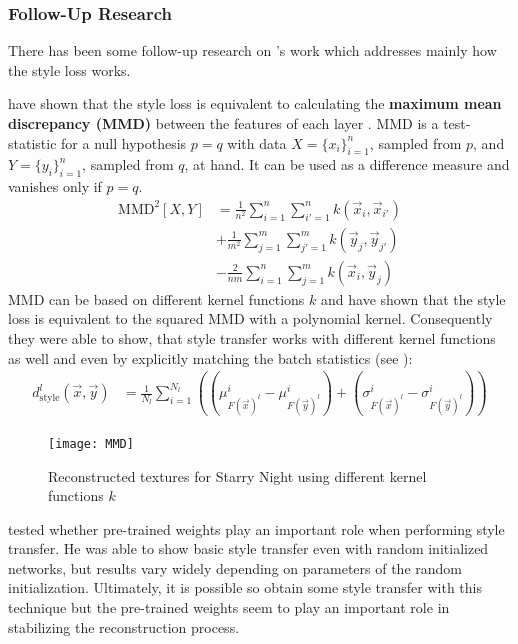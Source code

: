 \subsubsection{Follow-Up Research}
There has been some follow-up research on \citeauthor*{gatys}'s work which addresses mainly how the style loss works.

\citeauthor*{MMD} have shown that the style loss is equivalent to calculating the \textbf{maximum mean discrepancy (MMD)} between the features of each layer \cite{MMD}.
MMD is a test-statistic for a null hypothesis $p=q$ with data $X = \{x_i\}^n_{i=1}$, sampled from $p$, and $Y = \{y_i\}^n_{i=1}$, sampled from $q$, at hand.
It can be used as a difference measure and vanishes only if $p=q$.
\begin{align}
    \text{MMD}^2[X, Y] & = \frac{1}{n^2} \sum^n_{i=1} \sum^n_{i'=1} k(\vec{x}_i, \vec{x}_{i'}) \\
    & + \frac{1}{m^2} \sum^m_{j=1} \sum^m_{j'=1} k(\vec{y}_j, \vec{y}_{j'}) \\
    & - \frac{2}{nm} \sum^n_{i=1} \sum^m_{j=1} k(\vec{x}_i, \vec{y}_{j})
\end{align}
MMD can be based on different kernel functions $k$ and \citeauthor*{MMD} have shown that the style loss is equivalent to the squared MMD with a polynomial kernel.
Consequently they were able to show, that style transfer works with different kernel functions as well and even by explicitly matching the batch statistics (see ):
\begin{align}
    d_{\text{style}}^l(\vec{x}, \vec{y}) & = \frac{1}{N_l} \sum_{i = 1}^{N_l} \left( (\mu^i_{F(\vec{x})^l} - \mu^i_{F(\vec{y})^l}) + (\sigma^i_{F(\vec{x})^l} - \sigma^i_{F(\vec{y})^l}) \right)
\end{align}
\begin{figure}
    \texttt{[image: MMD]}
    \caption[]{Reconstructed textures for Starry Night using different kernel functions $k$ \cite{MMD}}
\end{figure}

\citeauthor*{LenDu} tested whether pre-trained weights play an important role when performing style transfer.
He was able to show basic style transfer even with random initialized networks, but results vary widely depending on parameters of the random initialization.
Ultimately, it is possible so obtain some style transfer with this technique but the pre-trained weights seem to play an important role in stabilizing the reconstruction process.

